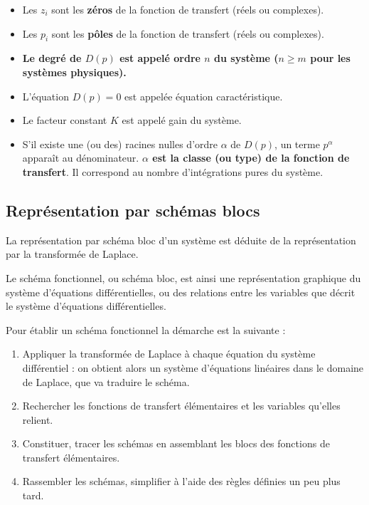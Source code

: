 \documentclass[10pt,fleqn]{article} %
\begin{document}
 \begin{itemize}
 \item Les $z_i$ sont les \textbf{zéros} de la fonction de transfert (réels ou
complexes).
\item Les $p_i$ sont les \textbf{pôles} de la fonction de transfert (réels ou
complexes).
\item \textbf{Le degré de $D(p)$ est appelé ordre $n$ du système ($n\geq m$ pour les
systèmes physiques).}
\item L'équation $D(p)=0$ est appelée équation caractéristique.
\item Le facteur constant $K$ est appelé gain du système.
\item S'il existe une (ou des) racines nulles d'ordre $\alpha$ de $D(p)$, un
terme $p^\alpha$ apparaît au dénominateur. \textbf{$\alpha$ est la classe (ou type) de
la fonction de transfert}. Il correspond au nombre d'intégrations pures du
système.
\end{itemize}



\subsection{Représentation par schémas blocs}
La représentation par schéma bloc d’un système est déduite de la représentation
par la transformée de Laplace.

Le schéma fonctionnel, ou schéma bloc, est ainsi une représentation graphique du
système d’équations différentielles, ou des relations entre les variables que
décrit le système d’équations différentielles.

\begin{resultat}
Pour établir un schéma fonctionnel la démarche est la suivante :
\begin{enumerate}
\item Appliquer la transformée de Laplace à chaque équation du système différentiel : on obtient alors un système d’équations linéaires
dans le domaine de Laplace, que va traduire le schéma.
\item Rechercher les fonctions de transfert élémentaires et les variables qu’elles relient.
\item Constituer, tracer les schémas en assemblant les blocs des fonctions de transfert élémentaires.
\item Rassembler les schémas, simplifier à l’aide des règles définies un peu plus tard.
\end{enumerate}

\end{resultat}
\end{document}
